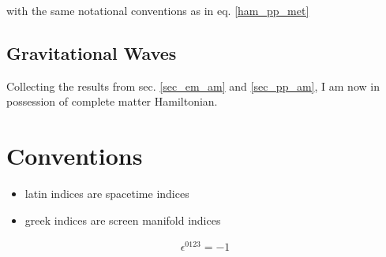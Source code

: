 \documentclass[11pt]{article}
\begin{document}
with the same notational conventions as in eq. \ref{ham_pp_met}

\subsection{Gravitational Waves}

Collecting the results from sec. \ref{sec_em_am} and \ref{sec_pp_am}, I am now in possession of complete matter Hamiltonian.


\section{Conventions}

\begin{itemize}
	\item latin indices are spacetime indices
	\item greek indices are screen manifold indices
\end{itemize}

\begin{align} \label{conv_eps}
	\epsilon^{0 1 2 3} =  - 1
\end{align}
\end{document}
